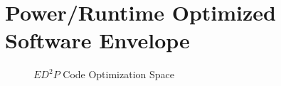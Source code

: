 \section{Power/Runtime Optimized Software Envelope}
\begin{figure}
\centering

\caption{$ED^2P$ Code Optimization Space}
\label{fig:modeldraw}
\end{figure}